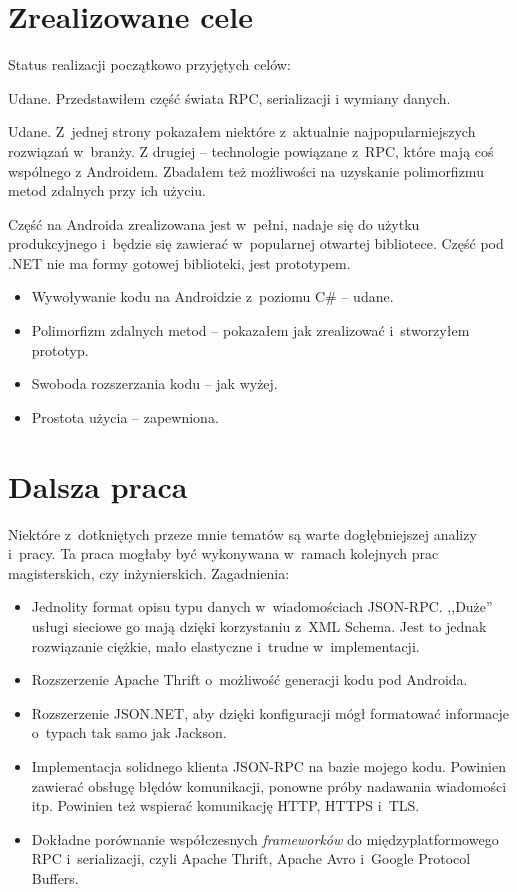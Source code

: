 \section{Zrealizowane cele}
Status realizacji początkowo przyjętych celów:
\begin{description}
Udane. Przedstawiłem część świata RPC, serializacji i wymiany danych.

Udane. Z~jednej strony pokazałem niektóre z~aktualnie najpopularniejszych rozwiązań w~branży. Z drugiej -- technologie powiązane z~RPC, które mają coś wspólnego z Androidem.
Zbadałem też możliwości na uzyskanie polimorfizmu metod zdalnych przy ich użyciu.

Część na Androida zrealizowana jest w~pełni, nadaje się do użytku produkcyjnego i~będzie się zawierać w~popularnej otwartej bibliotece.
Część pod .NET nie ma formy gotowej biblioteki, jest prototypem.
\begin{itemize}
  \item Wywoływanie kodu na Androidzie z~poziomu C\# -- udane.
	\item Polimorfizm zdalnych metod -- pokazałem jak zrealizować i~stworzyłem prototyp.
	\item Swoboda rozszerzania kodu -- jak wyżej.
	\item Prostota użycia -- zapewniona.
\end{itemize}

\end{description}



\section{Dalsza praca}
Niektóre z~dotkniętych przeze mnie tematów są warte dogłębniejszej analizy i~pracy.
Ta praca mogłaby być wykonywana w~ramach kolejnych prac magisterskich, czy inżynierskich.
Zagadnienia:
\begin{itemize}
	\item Jednolity format opisu typu danych w~wiadomościach JSON-RPC. ,,Duże'' usługi sieciowe go mają dzięki korzystaniu z~XML Schema. Jest to jednak rozwiązanie ciężkie, mało elastyczne i~trudne w~implementacji.
	\item Rozszerzenie Apache Thrift o~możliwość generacji kodu pod Androida.
	\item Rozszerzenie JSON.NET, aby dzięki konfiguracji mógł formatować informacje o~typach tak samo jak Jackson.
	\item Implementacja solidnego klienta JSON-RPC na bazie mojego kodu. Powinien zawierać obsługę błędów komunikacji, ponowne próby nadawania wiadomości itp. Powinien też wspierać komunikację HTTP, HTTPS i~TLS.
	\item Dokładne porównanie współczesnych \emph{frameworków} do międzyplatformowego RPC i~serializacji, czyli Apache Thrift, Apache Avro i~Google Protocol Buffers.
\end{itemize}


